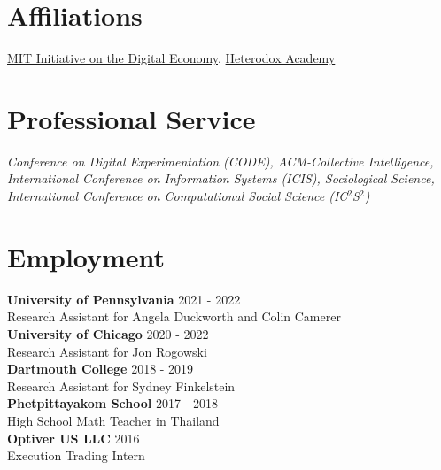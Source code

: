 \documentclass[margin,line,pifont,palatino,courier, 9pt]{res}
\begin{document}
\begin{resume}
\section{\sc Affiliations}
\href{https://ide.mit.edu/}{MIT Initiative on the Digital Economy}, \href{https://heterodoxacademy.org/}{Heterodox Academy}

\section{\sc Professional Service}
\textit{Conference on Digital Experimentation (CODE), ACM-Collective Intelligence, International Conference on Information Systems (ICIS), Sociological Science, International Conference on Computational Social Science (IC$^2$S$^2$)}

\section{\sc Employment}
\textbf{University of Pennsylvania} \hfill 2021 - 2022 \\
Research Assistant for Angela Duckworth and Colin Camerer \vspace{2mm}\\
\textbf{University of Chicago} \hfill 2020 - 2022\\
Research Assistant for Jon Rogowski \vspace{2mm}\\
\textbf{Dartmouth College} \hfill 2018 - 2019 \\
Research Assistant for Sydney Finkelstein \vspace{2mm}\\
\textbf{Phetpittayakom School} \hfill 2017 - 2018 \\
High School Math Teacher in Thailand \vspace{2mm}\\
\textbf{Optiver US LLC} \hfill 2016 \\
Execution Trading Intern

\end{resume}
\end{document}
